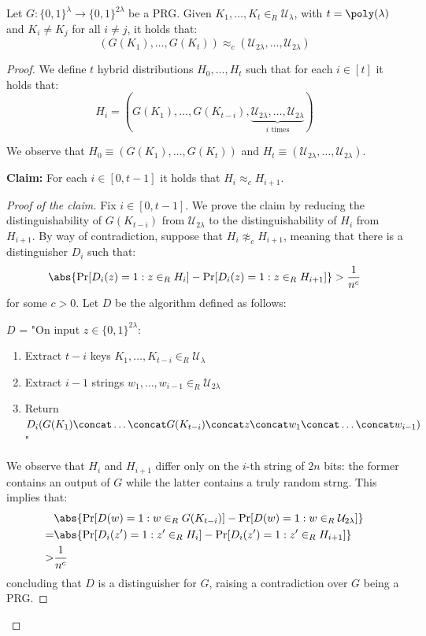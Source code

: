 \documentclass[a4paper, 12pt]{report}
\begin{document}
    \begin{framedlem}[label={t_prg_uniform}]{}
        Let $G : \{0,1\}^\lambda \to \{0,1\}^{2\lambda}$ be a PRG. Given $K_1, \ldots, K_t \in_R \mathcal{U}_\lambda$, with $t = \poly(\lambda)$ and $K_i \neq K_j$ for all $i \neq j$, it holds that:
        \[(G(K_1), \ldots, G(K_t)) \approx_c (\mathcal{U}_{2\lambda}, \ldots, \mathcal{U}_{2\lambda})\] 
    \end{framedlem}

    \begin{proof}
        We define $t$ hybrid distributions $H_0, \ldots, H_t$ such that for each $i \in [t]$ it holds that:
        \[H_i = (G(K_1), \ldots, G(K_{t-i}), \underbrace{\mathcal{U}_{2\lambda}, \ldots, \mathcal{U}_{2\lambda}}_{i \text{ times}})\]

        We observe that $H_0 \equiv (G(K_1), \ldots, G(K_t))$ and $H_t \equiv (\mathcal{U}_{2\lambda}, \ldots, \mathcal{U}_{2\lambda})$.

        \textbf{Claim:} For each $i \in [0,t-1]$ it holds that $H_i \approx_c H_{i+1}$.

        \begin{proof}[Proof of the claim]
            Fix $i \in [0, t-1]$. We prove the claim by reducing the distinguishability of $G(K_{t-i})$ from $\mathcal{U}_{2\lambda}$ to the distinguishability of $H_i$ from $H_{i+1}$. By way of contradiction, suppose that $H_i \not\approx_c H_{i+1}$, meaning that there is a distinguisher $D_i$ such that:
            \[\abs{\Pr[D_i(z) = 1 : z \in_R H_i] - \Pr[D_i(z) = 1 : z \in_R H_{i+1}]} > \frac{1}{n^c}\]
            for some $c > 0$. Let $D$ be the algorithm defined as follows:

            $D$ = "On input $z \in \{0,1\}^{2\lambda}$:

            \begin{enumerate}
                \item Extract $t-i$ keys $K_1, \ldots, K_{t-i} \in_R \mathcal{U}_\lambda$
                \item Extract $i-1$ strings $w_{1}, \ldots, w_{i-1} \in_R \mathcal{U}_{2\lambda}$
                \item Return $D_i(G(K_1) \concat \ldots \concat G(K_{t-i}) \concat z \concat w_1 \concat \ldots \concat w_{i-1})$"
            \end{enumerate}
            
            We observe that $H_i$ and $H_{i+1}$ differ only on the $i$-th string of $2n$ bits: the former contains an output of $G$ while the latter contains a truly random strng. This implies that:
            \[\begin{split}
                &\abs{\Pr[D(w) = 1 : w \in_R G(K_{t-i})] - \Pr[D(w) = 1 : w \in_R \mathcal{U}_{2\lambda}]}\\
                = &\abs{\Pr[D_i(z') = 1 : z' \in_R H_i] - \Pr[D_i(z') = 1 : z' \in_R H_{i+1}]} \\
                > &\frac{1}{n^c}
            \end{split}\]
            concluding that $D$ is a distinguisher for $G$, raising a contradiction over $G$ being a PRG.
        \end{proof}
         

\end{proof}
\end{document}
